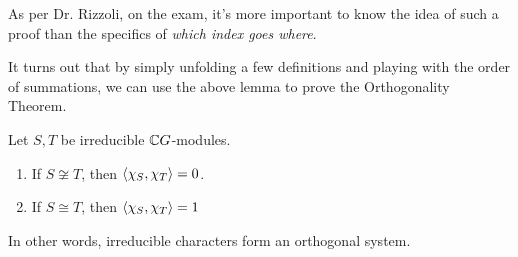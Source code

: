 \begin{remark}
    As per Dr. Rizzoli, on the exam, it's more important to know the idea of such a proof than the specifics of \textit{which index goes where}.
\end{remark}

It turns out that by simply unfolding a few definitions and playing with the order of summations, we can use the above lemma to prove the Orthogonality Theorem.

\begin{boxtheorem} \label{Ch2:Thm:Orth_Char}
    Let $S, T$ be irreducible $\mathbb{C} G$-modules.
    \begin{enumerate}[label = \normalfont \arabic*., noitemsep]
        \item If $S \not\cong T$, then $\left\langle \chi_S, \chi_T \right\rangle = 0$.
        \item If $S \cong T$, then $\left\langle \chi_S, \chi_T \right\rangle = 1$
    \end{enumerate}
    In other words, irreducible characters form an orthogonal system.
\end{boxtheorem}
